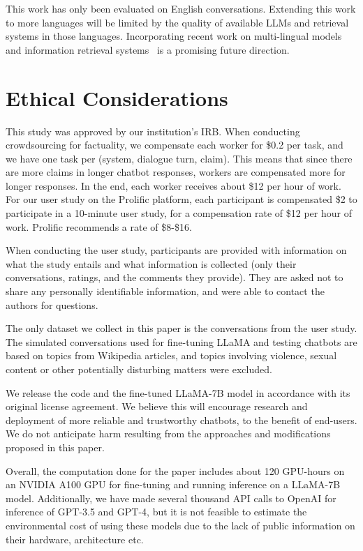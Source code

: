 \documentclass[11pt]{article}
\newcommand{\Red}[1]{{\color{comment-red} #1}}
\begin{document}
This work has only been evaluated on English conversations. Extending this work to more languages will be limited by the quality of available LLMs and retrieval systems in those languages. Incorporating recent work on multi-lingual models~\cite{scao2022bloom} and information retrieval systems~\cite{colbertx2022} is a promising future direction.


\section*{Ethical Considerations}

This study was approved by our institution's IRB.
When conducting crowdsourcing for factuality, we compensate each worker for \$0.2 per task, and we have one task per (system, dialogue turn, claim). This means that since there are more claims in longer chatbot responses, workers are compensated more for longer responses. In the end, each worker receives about \$12 per hour of work.
For our user study on the Prolific platform, each participant is compensated \$2 to participate in a 10-minute user study, for a compensation rate of \$12 per hour of work. Prolific recommends a rate of \$8-\$16.

When conducting the user study, participants are provided with information on what the study entails and what information is collected (only their conversations, ratings, and the comments they provide). They are asked not to share any personally identifiable information, and were able to contact the authors for questions.

The only dataset we collect in this paper is the conversations from the user study. The simulated conversations used for fine-tuning LLaMA and testing chatbots are based on topics from Wikipedia articles, and topics involving violence, sexual content or other potentially disturbing matters were excluded.

We release the code and the fine-tuned LLaMA-7B model in accordance with its original license agreement.
We believe this will encourage research and deployment of more reliable and trustworthy chatbots, to the benefit of end-users.
We do not anticipate harm resulting from the approaches and modifications proposed in this paper.

Overall, the computation done for the paper includes about 120 GPU-hours on an NVIDIA A100 GPU for fine-tuning and running inference on a LLaMA-7B model. Additionally, we have made several thousand API calls to OpenAI for inference of GPT-3.5 and GPT-4, but it is not feasible to estimate the environmental cost of using these models due to the lack of public information on their hardware, architecture etc.
\end{document}
